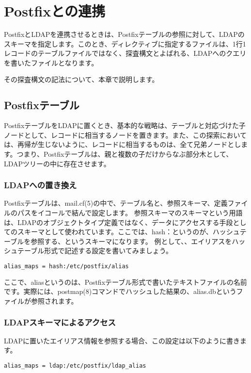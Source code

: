 \chapter{Postfixとの連携}

PostfixとLDAPを連携させるときは、Postfixテーブルの参照に対して、LDAPのスキーマを指定します。このとき、ディレクティブに指定するファイルは、1行1レコードのテーブルファイルではなく、探査構文とよばれる、LDAPへのクエリを書いたファイルとなります。

その探査構文の記法について、本章で説明します。

\section{Postfixテーブル}

PostfixテーブルをLDAPに置くとき、基本的な戦略は、テーブルと対応づけた子ノードとして、レコードに相当するノードを置きます。また、この探索においては、再帰が生じないように、レコードに相当するものは、全て兄弟ノードとします。つまり、Postfixテーブルは、親と複数の子だけからなぶ部分木として、LDAPツリーの中に存在させます。

\subsection{LDAPへの置き換え}
Postfixテーブルは、mail.cf(5)の中で、テーブル名と、参照スキーマ、定義ファイルのパスをイコールで結んで設定します。
参照スキーマのスキーマという用語は、LDAPのオブジェクトタイプ定義ではなく、データにアクセスする手段としてのスキーマとして使われています。ここでは、hash：というのが、ハッシュテーブルを参照する、というスキーマになります。
例として、、エイリアスをハッシュテーブル形式で記述する設定を書いてみましょう。

\begin{verbatim}
alias_maps = hash:/etc/postfix/alias
\end{verbatim}

ここで、aliasというのは、Postfixテーブル形式で書いたテキストファイルの名前です。実際には、postmap(8)コマンドでハッシュした結果の、alias.dbというファイルが参照されます。

\subsection{LDAPスキーマによるアクセス}

LDAPに置いたエイリアス情報を参照する場合、この設定は以下のように書きます。

\begin{verbatim}
alias_maps = ldap:/etc/postfix/ldap_alias
\end{verbatim}

